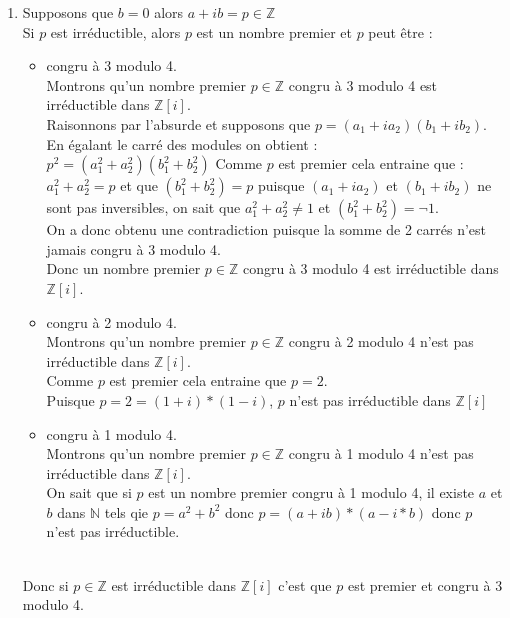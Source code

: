 \documentclass[a4paper,11pt]{book}
\newcommand{\Z}{{\mathbb{Z}}}
\newcommand{\N}{{\mathbb{N}}}
\begin{document}
\begin{enumerate}
\item Supposons que $b=0$ alors $a+ib=p\in \Z$\\
Si $p$ est irr\'eductible, alors  $p$ est un nombre premier et $p$ peut \^etre :
\begin{itemize}
\item congru \`a 3 modulo 4.\\
Montrons qu'un nombre premier $p\in \Z$ congru \`a 3 modulo 4 est 
irr\'eductible dans $\Z[i]$.\\
Raisonnons par l'absurde et supposons que $p=(a_1+ia_2)(b_1+ib_2)$.\\
En \'egalant le carr\'e des modules on obtient :\\
$p^2=(a_1^2+a_2^2)(b_1^2+b_2^2)$
Comme $p$ est premier cela entraine que :\\
$a_1^2+a_2^2=p$ et que $(b_1^2+b_2^2)=p$
puisque $(a_1+ia_2)$ et $(b_1+ib_2)$ ne sont pas inversibles, on sait que 
$a_1^2+a_2^2\neq 1$ et $(b_1^2+b_2^2)=\neg 1$.\\
On a donc obtenu une contradiction puisque la somme de 2 carr\'es n'est jamais 
congru \`a 3 modulo 4.\\
Donc un nombre premier $p\in \Z$ congru \`a 3 modulo 4 est irr\'eductible dans
$\Z[i]$.\\
\item congru \`a 2 modulo 4.\\
Montrons qu'un nombre premier $p\in \Z$ congru \`a 2 modulo 4 n'est pas
irr\'eductible dans $\Z[i]$.\\
Comme $p$ est premier cela entraine que $p=2$.\\
Puisque $p=2=(1+i)*(1-i)$, $p$ n'est pas
irr\'eductible dans $\Z[i]$
\item congru \`a 1 modulo 4.\\
Montrons qu'un nombre premier $p\in \Z$ congru \`a 1 modulo 4 n'est pas
irr\'eductible dans $\Z[i]$.\\
On sait que si $p$ est un nombre premier congru \`a 1 modulo 4, il existe $a$ 
et $b$ dans $\N$ tels qie $p=a^2+b^2$ donc 
$p=(a+ib)*(a-i*b)$ donc $p$ n'est pas irr\'eductible.
\end{itemize}
\ \\
Donc si $p \in \Z$ est irr\'eductible dans $\Z[i]$ c'est que $p$ est premier
et congru \`a 3 modulo 4.


\end{enumerate}
\end{document}
